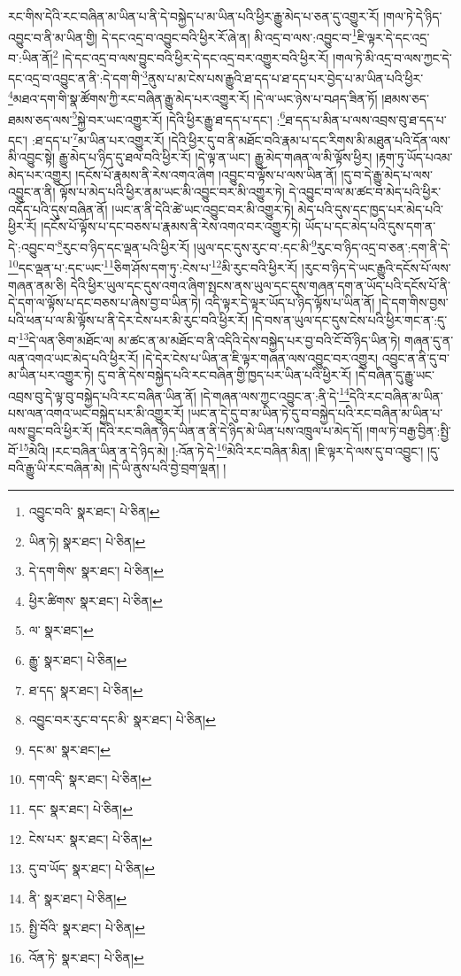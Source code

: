 རང་གིས་དེའི་རང་བཞིན་མ་ཡིན་པ་ནི་དེ་བསྐྱེད་པ་མ་ཡིན་པའི་ཕྱིར་རྒྱུ་མེད་པ་ཅན་དུ་འགྱུར་རོ། །གལ་ཏེ་དེ་ཉིད་འབྱུང་བ་ནི་མ་ཡིན་གྱི། དེ་དང་འདྲ་བ་འབྱུང་བའི་ཕྱིར་རོ་ཞེ་ན། མི་འདྲ་བ་ལས་:འབྱུང་བ་\footnote{འབྱུང་བའི་  སྣར་ཐང་།  པེ་ཅིན། }ཇི་ལྟར་དེ་དང་འདྲ་བ་:ཡིན་ནོ།\footnote{ཡིན་ཏེ།  སྣར་ཐང་།  པེ་ཅིན། } །དེ་དང་འདྲ་བ་ལས་བྱུང་བའི་ཕྱིར་དེ་དང་འདྲ་བར་འགྱུར་བའི་ཕྱིར་རོ། །གལ་ཏེ་མི་འདྲ་བ་ལས་ཀྱང་དེ་དང་འདྲ་བ་འབྱུང་ན་ནི་:དེ་དག་གི་\footnote{དེ་དག་གིས་  སྣར་ཐང་།  པེ་ཅིན། }ནུས་པ་མ་ངེས་པས་རྒྱུའི་ཐ་དད་པ་ཐ་དད་པར་བྱེད་པ་མ་ཡིན་པའི་ཕྱིར་\footnote{ཕྱིར་ཚིགས་  སྣར་ཐང་།  པེ་ཅིན། }མཐའ་དག་གི་སྣ་ཚོགས་ཀྱི་རང་བཞིན་རྒྱུ་མེད་པར་འགྱུར་རོ། །དེ་ལ་ཡང་ཉེས་པ་བཤད་ཟིན་ཏོ། །ཐམས་ཅད་ཐམས་ཅད་ལས་\footnote{ལ་  སྣར་ཐང་། }སྐྱེ་བར་ཡང་འགྱུར་རོ། །དེའི་ཕྱིར་རྒྱུ་ཐ་དད་པ་དང་། :\footnote{རྒྱུ་  སྣར་ཐང་།  པེ་ཅིན། }ཐ་དད་པ་མིན་པ་ལས་འབྲས་བུ་ཐ་དད་པ་དང་། :ཐ་དད་པ་\footnote{ཐ་དད་  སྣར་ཐང་།  པེ་ཅིན། }མ་ཡིན་པར་འགྱུར་རོ། །དེའི་ཕྱིར་དུ་བ་ནི་མཐོང་བའི་རྣམ་པ་དང་རིགས་མི་མཐུན་པའི་དོན་ལས་མི་འབྱུང་སྟེ། རྒྱུ་མེད་པ་ཉིད་དུ་ཐལ་བའི་ཕྱིར་རོ། །དེ་ལྟ་ན་ཡང་། རྒྱུ་མེད་གཞན་ལ་མི་ལྟོས་ཕྱིར། །རྟག་ཏུ་ཡོད་པའམ་མེད་པར་འགྱུར། །དངོས་པོ་རྣམས་ནི་རེས་འགའ་ཞིག །འབྱུང་བ་ལྟོས་པ་ལས་ཡིན་ནོ། །དུ་བ་དེ་རྒྱུ་མེད་པ་ལས་འབྱུང་ན་ནི། ལྟོས་པ་མེད་པའི་ཕྱིར་ནམ་ཡང་མི་འབྱུང་བར་མི་འགྱུར་ཏེ། དེ་འབྱུང་བ་ལ་མ་ཚང་བ་མེད་པའི་ཕྱིར་འདོད་པའི་དུས་བཞིན་ནོ། །ཡང་ན་ནི་དེའི་ཚེ་ཡང་འབྱུང་བར་མི་འགྱུར་ཏེ། མེད་པའི་དུས་དང་ཁྱད་པར་མེད་པའི་ཕྱིར་རོ། །དངོས་པོ་ལྟོས་པ་དང་བཅས་པ་རྣམས་ནི་རེས་འགའ་བར་འགྱུར་ཏེ། ཡོད་པ་དང་མེད་པའི་དུས་དག་ན་དེ་:འབྱུང་བ་\footnote{འབྱུང་བར་རུང་བ་དང་མི་  སྣར་ཐང་།  པེ་ཅིན། }རུང་བ་ཉིད་དང་ལྡན་པའི་ཕྱིར་རོ། །ཡུལ་དང་དུས་རུང་བ་:དང་མི་\footnote{དང་མ་  སྣར་ཐང་། }རུང་བ་ཉིད་འདྲ་བ་ཅན་:དག་ནི་དེ་\footnote{དག་འདི་  སྣར་ཐང་།  པེ་ཅིན། }དང་ལྡན་པ་:དང་ཡང་\footnote{དང་  སྣར་ཐང་།  པེ་ཅིན། }ཅིག་ཤོས་དག་ཏུ་:ངེས་པ་\footnote{ངེས་པར་  སྣར་ཐང་།  པེ་ཅིན། }མི་རུང་བའི་ཕྱིར་རོ། །རུང་བ་ཉིད་དེ་ཡང་རྒྱུའི་དངོས་པོ་ལས་གཞན་ནམ་ཅི། དེའི་ཕྱིར་ཡུལ་དང་དུས་འགའ་ཞིག་སྤངས་ནས་ཡུལ་དང་དུས་གཞན་དག་ན་ཡོད་པའི་དངོས་པོ་ནི་དེ་དག་ལ་ལྟོས་པ་དང་བཅས་པ་ཞེས་བྱ་བ་ཡིན་ཏེ། འདི་ལྟར་དེ་ལྟར་ཡོད་པ་ཉིད་ལྟོས་པ་ཡིན་ནོ། །དེ་དག་གིས་བྱས་པའི་ཕན་པ་ལ་མི་ལྟོས་པ་ནི་དེར་ངེས་པར་མི་རུང་བའི་ཕྱིར་རོ། །དེ་བས་ན་ཡུལ་དང་དུས་ངེས་པའི་ཕྱིར་གང་ན་:དུ་བ་\footnote{དུ་བ་ཡོད་  སྣར་ཐང་།  པེ་ཅིན། }དེ་ལན་ཅིག་མཐོང་ལ། མ་ཚང་ན་མ་མཐོང་བ་ནི་འདིའི་དེས་བསྐྱེད་པར་བྱ་བའི་ངོ་བོ་ཉིད་ཡིན་ཏེ། གཞན་དུ་ན་ལན་འགའ་ཡང་མེད་པའི་ཕྱིར་རོ། །དེ་དེར་ངེས་པ་ཡིན་ན་ཇི་ལྟར་གཞན་ལས་འབྱུང་བར་འགྱུར། འབྱུང་ན་ནི་དུ་བ་མ་ཡིན་པར་འགྱུར་ཏེ། དུ་བ་ནི་དེས་བསྐྱེད་པའི་རང་བཞིན་གྱི་ཁྱད་པར་ཡིན་པའི་ཕྱིར་རོ། །དེ་བཞིན་དུ་རྒྱུ་ཡང་འབྲས་བུ་དེ་ལྟ་བུ་བསྐྱེད་པའི་རང་བཞིན་ཡིན་ནོ། །དེ་གཞན་ལས་ཀྱང་འབྱུང་ན་:ནི་དེ་\footnote{ནི་  སྣར་ཐང་།  པེ་ཅིན། }དེའི་རང་བཞིན་མ་ཡིན་པས་ལན་འགའ་ཡང་བསྐྱེད་པར་མི་འགྱུར་རོ། །ཡང་ན་དེ་དུ་བ་མ་ཡིན་ཏེ་དུ་བ་བསྐྱེད་པའི་རང་བཞིན་མ་ཡིན་པ་ལས་བྱུང་བའི་ཕྱིར་རོ། །དེའི་རང་བཞིན་ཉིད་ཡིན་ན་ནི་དེ་ཉིད་མེ་ཡིན་པས་འཁྲུལ་པ་མེད་དོ། །གལ་ཏེ་བརྒྱ་བྱིན་:སྤྱི་བོ་\footnote{སྤྱི་བོའི་  སྣར་ཐང་།  པེ་ཅིན། }མེའི། །རང་བཞིན་ཡིན་ན་དེ་ཉིད་མེ། །:འོན་ཏེ་དེ་\footnote{འོན་ཏེ་  སྣར་ཐང་།  པེ་ཅིན། }མེའི་རང་བཞིན་མིན། །ཇི་ལྟར་དེ་ལས་དུ་བ་འབྱུང་། །དུ་བའི་རྒྱུ་ཡི་རང་བཞིན་མེ། །དེ་ཡི་ནུས་པའི་བྱེ་བྲག་ལྡན། །
